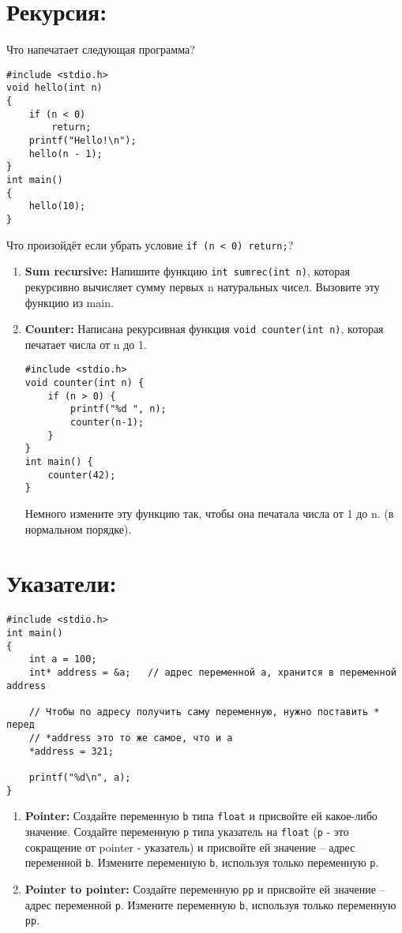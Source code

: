 \documentclass{article}
\begin{document}
\section*{Рекурсия:}
Что напечатает следующая программа?
\begin{lstlisting}
#include <stdio.h>
void hello(int n)
{
	if (n < 0)
		return;
	printf("Hello!\n");
	hello(n - 1);
}
int main()
{
	hello(10);
}
\end{lstlisting}
Что произойдёт если убрать условие \texttt{if (n < 0) return;}?

\begin{enumerate}
\item \textbf{Sum recursive:} Напишите функцию \texttt{int sumrec(int n)}, которая рекурсивно вычисляет сумму первых n натуральных чисел. Вызовите эту функцию из main.

\item \textbf{Counter:} Написана рекурсивная функция \texttt{void counter(int n)}, которая печатает числа от n до 1.
\begin{lstlisting}
#include <stdio.h>
void counter(int n) {
	if (n > 0) {
		printf("%d ", n);
		counter(n-1);
	}
}
int main() {
	counter(42);
}
\end{lstlisting}
Немного измените эту функцию так, чтобы она печатала числа от 1 до n. (в нормальном порядке).
\end{enumerate}


\section*{Указатели:}
\begin{lstlisting}
#include <stdio.h>
int main()
{
	int a = 100;
	int* address = &a;   // адрес переменной a, хранится в переменной address
	
	// Чтобы по адресу получить саму переменную, нужно поставить * перед
	// *address это то же самое, что и a
	*address = 321;
	
	printf("%d\n", a);     
}
\end{lstlisting}
\begin{enumerate}
\item \textbf{Pointer:} Создайте переменную \texttt{b} типа \texttt{float} и присвойте ей какое-либо значение. Создайте переменную \texttt{p} типа указатель на \texttt{float} (\texttt{p} - это сокращение от pointer - указатель)  и присвойте ей значение -- адрес переменной \texttt{b}. Измените переменную \texttt{b}, используя только переменную \texttt{p}.
\item \textbf{Pointer to pointer:} Создайте переменную \texttt{pp} и присвойте ей значение -- адрес переменной \texttt{p}. Измените переменную \texttt{b}, используя только переменную \texttt{pp}.
\end{enumerate}
\end{document}
